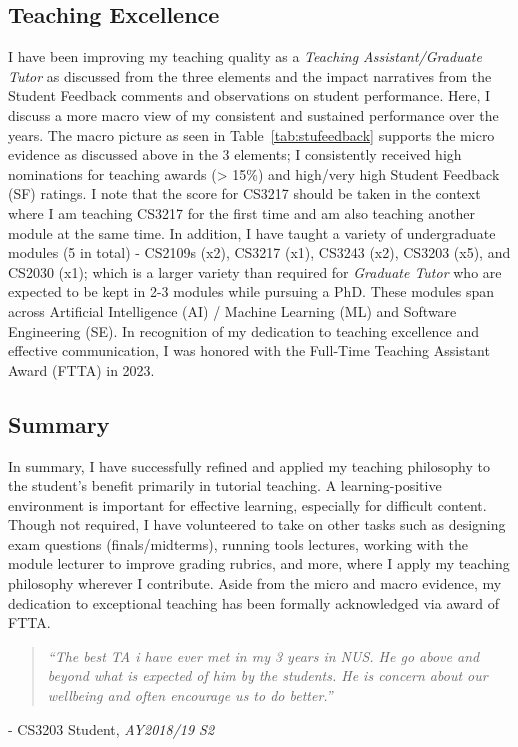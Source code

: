 \documentclass[11pt, a4paper]{article}
\newcommand{\chapquote}[3]{\begin{quotation} \textit{#1} \end{quotation} \begin{flushright} - #2, \textit{#3}\end{flushright} }
\begin{document}
\subsection{Teaching Excellence}
I have been improving my teaching quality as a \emph{Teaching Assistant/Graduate Tutor} as discussed from the three elements and the impact narratives from the Student Feedback comments and observations on student performance. Here, I discuss a more macro view of my consistent and sustained performance over the years. The macro picture as seen in Table~\ref{tab:stufeedback} supports the micro evidence as discussed above in the 3 elements; I consistently received high nominations for teaching awards (> 15\%) and high/very high Student Feedback (SF) ratings. 
I note that the score for CS3217 should be taken in the context where I am teaching CS3217 for the first time and am also teaching another module at the same time.
In addition, I have taught a variety of undergraduate modules (5 in total) - CS2109s (x2), CS3217 (x1), CS3243 (x2), CS3203 (x5), and CS2030 (x1); which is a larger variety than required for \emph{Graduate Tutor} who are expected to be kept in 2-3 modules while pursuing a PhD.
These modules span across Artificial Intelligence (AI) / Machine Learning (ML) and Software Engineering (SE).
In recognition of my dedication to teaching excellence and effective communication, 
I was honored with the Full-Time Teaching Assistant Award (FTTA) in 2023. 

\subsection{Summary}
In summary, I have successfully refined and applied my teaching philosophy to the student's benefit primarily in tutorial teaching.
A learning-positive environment is important for effective learning, especially for difficult content.
Though not required, I have volunteered to take on other tasks such as designing exam questions (finals/midterms), running tools lectures, working with the module lecturer to improve grading rubrics, and more, where I apply my teaching philosophy wherever I contribute.
Aside from the micro and macro evidence, 
my dedication to exceptional teaching has been formally acknowledged via award of FTTA.\\[1em]

\chapquote{``The best TA i have ever met in my 3 years in NUS. He go above and beyond what is expected of him by the students. He is concern about our wellbeing and often encourage us to do better.''}{CS3203 Student}{AY2018/19 S2}
\end{document}
